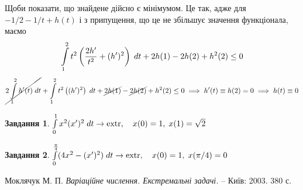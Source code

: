 \documentclass[12pt]{article} %
\newtheorem{prob}{Завдання}
\newcommand{\dt}{\;dt}
\let\oldint\int
\renewcommand{\int}{\oldint\limits}
\newcommand{\extr}{\mbox{\normalfont extr}}
\begin{document}
Щоби показати, що знайдене дійсно є мінімумом. Це так, адже для $-1/2-1/t+h(t)$ і з припущення, що це не збільшує значення функціонала, маємо
\[\int_1^2t^2\mybra{\frac{2h'}{t^2}+(h')^2}\dt+2h(1)-2h(2)+h^2(2)\leq0\]
\[\cancel{2\int_1^2h'(t)\dt}+\int_1^2t^2\mybra{(h')^2}\dt+\cancel{2h(1)}-\cancel{2h(2)}+h^2(2)\leq0\implies h'(t)\equiv h(2)=0\implies h(t)\equiv0\]
\begin{prob}{}\; $\int_0^1x^2(x')^2\dt\to\extr,\quad x(0)=1,\;x(1)=\sqrt{2}$
\end{prob}
\begin{prob}{}\; $\int_0^{\frac{\pi}{4}}(4x^2-(x')^2)\dt\to\extr,\quad x(0)=1,\;x(\pi/4)=0$
\end{prob}
\begin{thebibliography}{9}
Моклячук М. П. \emph{Варіаційне числення. Екстремальні задачі.} --
Київ: 2003. 380 с.
\end{thebibliography}
\end{document}
